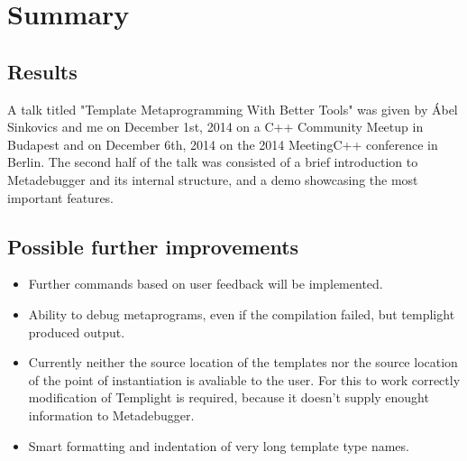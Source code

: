 
\chapter{Summary}

\section{Results}

A talk titled "Template Metaprogramming With Better Tools" was given by Ábel
Sinkovics and me on December 1st, 2014 on a C++ Community
Meetup\cite{cpp-meetup} in Budapest and on December 6th, 2014 on the
2014 MeetingC++ conference\cite{meeting-cpp} in Berlin. The second half of the
talk was consisted of a brief introduction to Metadebugger and its internal
structure, and a demo showcasing the most important features.

\section{Possible further improvements}

\begin{itemize}
    \item
        Further commands based on user feedback will be implemented.
    \item
        Ability to debug metaprograms, even if the compilation failed, but
        templight produced output.
    \item
        Currently neither the source location of the templates nor the source
        location of the point of instantiation is avaliable to the user. For
        this to work correctly modification of Templight is required, because
        it doesn't supply enought information to Metadebugger.
    \item
        Smart formatting and indentation of very long template type names.
\end{itemize}
